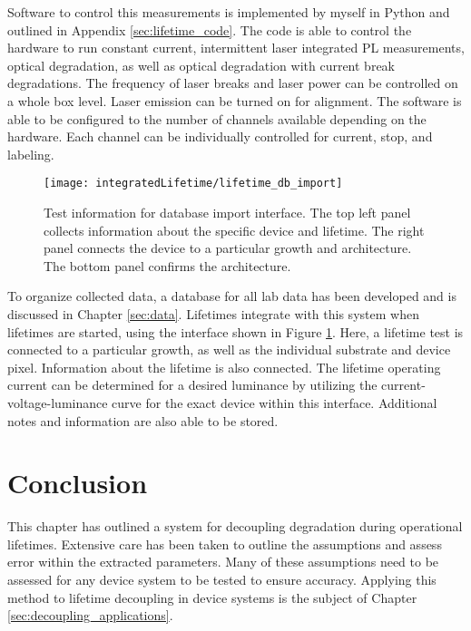 \documentclass[../thesis.tex]{subfiles}
\begin{document}
Software to control this measurements is implemented by myself in Python and outlined in Appendix \ref{sec:lifetime_code}.
The code is able to control the hardware to run constant current, intermittent laser integrated PL measurements, optical degradation, as well as optical degradation with current break degradations.
The frequency of laser breaks and laser power can be controlled on a whole box level.  
Laser emission can be turned on for alignment.
The software is able to be configured to the number of channels available depending on the hardware.
Each channel can be individually controlled for current, stop, and labeling.  

\begin{figure}[ht]
    \centering
    \texttt{[image: integratedLifetime/lifetime\_db\_import]}
\caption{Test information for database import interface.  The top left panel collects information about the specific device and lifetime.  The right panel connects the device to a particular growth and architecture.  The bottom panel confirms the architecture.}
\label{fig:lifetime_db_import}
\end{figure}

To organize collected data, a database for all lab data has been developed and is discussed in Chapter \ref{sec:data}.
Lifetimes integrate with this system when lifetimes are started, using the interface shown in Figure \ref{fig:lifetime_db_import}.
Here, a lifetime test is connected to a particular growth, as well as the individual substrate and device pixel. 
Information about the lifetime is also connected.  
The lifetime operating current can be determined for a desired luminance by utilizing the current-voltage-luminance curve for the exact device within this interface.  
Additional notes and information are also able to be stored.

\section{Conclusion}
This chapter has outlined a system for decoupling degradation during operational lifetimes.
Extensive care has been taken to outline the assumptions and assess error within the extracted parameters.  
Many of these assumptions need to be assessed for any device system to be tested to ensure accuracy.  
Applying this method to lifetime decoupling in device systems is the subject of Chapter \ref{sec:decoupling_applications}.



\end{document}
